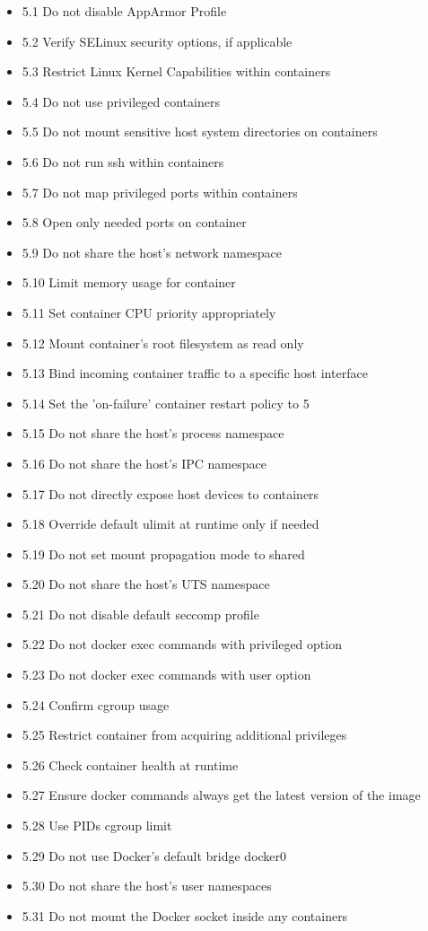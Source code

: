 \documentclass[times, twoside, watermark]{zHenriquesLab-StyleBioRxiv}
\begin{document}
\begin{itemize}
    \item 5.1 Do not disable AppArmor Profile 
    \item 5.2 Verify SELinux security options, if applicable 
    \item 5.3 Restrict Linux Kernel Capabilities within containers 
    \item 5.4 Do not use privileged containers 
    \item 5.5 Do not mount sensitive host system directories on containers
    \item 5.6 Do not run ssh within containers 
    \item 5.7 Do not map privileged ports within containers 
    \item 5.8 Open only needed ports on container 
    \item 5.9 Do not share the host's network namespace 
    \item 5.10 Limit memory usage for container 
    \item 5.11 Set container CPU priority appropriately 
    \item 5.12 Mount container's root filesystem as read only 
    \item 5.13 Bind incoming container traffic to a specific host interface 
    \item 5.14 Set the 'on-failure' container restart policy to 5 
    \item 5.15 Do not share the host's process namespace 
    \item 5.16 Do not share the host's IPC namespace 
    \item 5.17 Do not directly expose host devices to containers
    \item 5.18 Override default ulimit at runtime only if needed 
    \item 5.19 Do not set mount propagation mode to shared
    \item 5.20 Do not share the host's UTS namespace 
    \item 5.21 Do not disable default seccomp profile 
    \item 5.22 Do not docker exec commands with privileged option 
    \item 5.23 Do not docker exec commands with user option 
    \item 5.24 Confirm cgroup usage 
    \item 5.25 Restrict container from acquiring additional privileges 
    \item 5.26 Check container health at runtime 
    \item 5.27 Ensure docker commands always get the latest version of the image 
    \item 5.28 Use PIDs cgroup limit 
    \item 5.29 Do not use Docker's default bridge docker0 
    \item 5.30 Do not share the host's user namespaces 
    \item 5.31 Do not mount the Docker socket inside any containers 
\end{itemize}
\end{document}
